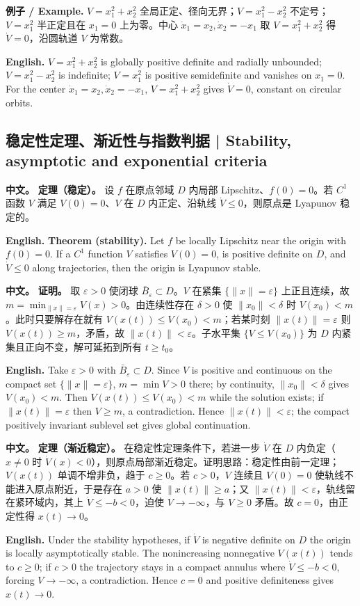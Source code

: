 \documentclass[UTF8,11pt,a4paper]{ctexart}
\newcommand{\EN}[1]{\par\noindent\textbf{English.} #1\par}
\newcommand{\EX}[2]{\par\noindent\textbf{例子 / Example.} #1\par\EN{#2}}
\newcommand{\APS}[2]{\par\noindent\textbf{中文。} #1\par\noindent\textbf{English.} #2\par}
\newcommand{\norm}[1]{\lVert #1\rVert}\newcommand{\abs}[1]{\lvert #1\rvert}
\begin{document}
\EX{$V=x_1^2+x_2^2$ 全局正定、径向无界；$V=x_1^2-x_2^2$ 不定号；$V=x_1^2$ 半正定且在 $x_1=0$ 上为零。中心 $\dot x_1=x_2,\dot x_2=-x_1$ 取 $V=x_1^2+x_2^2$ 得 $\dot V=0$，沿圆轨道 $V$ 为常数。}{$V=x_1^2+x_2^2$ is globally positive definite and radially unbounded; $V=x_1^2-x_2^2$ is indefinite; $V=x_1^2$ is positive semidefinite and vanishes on $x_1=0$. For the center $\dot x_1=x_2,\dot x_2=-x_1$, $V=x_1^2+x_2^2$ gives $\dot V=0$, constant on circular orbits.}

\subsection{稳定性定理、渐近性与指数判据 | Stability, asymptotic and exponential criteria}
\APS{\textbf{定理（稳定）。} 设 $f$ 在原点邻域 $D$ 内局部 Lipschitz、$f(0)=0$。若 $C^1$ 函数 $V$ 满足 $V(0)=0$、$V$ 在 $D$ 内正定、沿轨线 $\dot V\le0$，则原点是 Lyapunov 稳定的。}{\textbf{Theorem (stability).} Let $f$ be locally Lipschitz near the origin with $f(0)=0$. If a $C^1$ function $V$ satisfies $V(0)=0$, is positive definite on $D$, and $\dot V\le0$ along trajectories, then the origin is Lyapunov stable.}

\APS{\textbf{证明。} 取 $\varepsilon>0$ 使闭球 $\bar B_\varepsilon\subset D$。$V$ 在紧集 $\{\norm{x}=\varepsilon\}$ 上正且连续，故 $m=\min_{\norm{x}=\varepsilon}V(x)>0$。由连续性存在 $\delta>0$ 使 $\norm{x_0}<\delta$ 时 $V(x_0)<m$。此时只要解存在就有 $V(x(t))\le V(x_0)<m$；若某时刻 $\norm{x(t)}=\varepsilon$ 则 $V(x(t))\ge m$，矛盾，故 $\norm{x(t)}<\varepsilon$。子水平集 $\{V\le V(x_0)\}$ 为 $D$ 内紧集且正向不变，解可延拓到所有 $t\ge t_0$。}{Take $\varepsilon>0$ with $\bar B_\varepsilon\subset D$. Since $V$ is positive and continuous on the compact set $\{\norm{x}=\varepsilon\}$, $m=\min V>0$ there; by continuity, $\norm{x_0}<\delta$ gives $V(x_0)<m$. Then $V(x(t))\le V(x_0)<m$ while the solution exists; if $\norm{x(t)}=\varepsilon$ then $V\ge m$, a contradiction. Hence $\norm{x(t)}<\varepsilon$; the compact positively invariant sublevel set gives global continuation.}

\APS{\textbf{定理（渐近稳定）。} 在稳定性定理条件下，若进一步 $\dot V$ 在 $D$ 内负定（$x\ne0$ 时 $\dot V(x)<0$），则原点局部渐近稳定。证明思路：稳定性由前一定理；$V(x(t))$ 单调不增非负，趋于 $c\ge0$。若 $c>0$，$V$ 连续且 $V(0)=0$ 使轨线不能进入原点附近，于是存在 $a>0$ 使 $\norm{x(t)}\ge a$；又 $\norm{x(t)}<\varepsilon$，轨线留在紧环域内，其上 $\dot V\le-b<0$，迫使 $V\to-\infty$，与 $V\ge0$ 矛盾。故 $c=0$，由正定性得 $x(t)\to0$。}{Under the stability hypotheses, if $\dot V$ is negative definite on $D$ the origin is locally asymptotically stable. The nonincreasing nonnegative $V(x(t))$ tends to $c\ge0$; if $c>0$ the trajectory stays in a compact annulus where $\dot V\le-b<0$, forcing $V\to-\infty$, a contradiction. Hence $c=0$ and positive definiteness gives $x(t)\to0$.}
\end{document}
